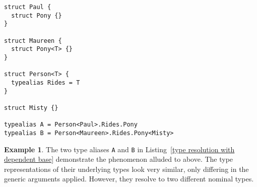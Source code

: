 \documentclass[a4paper,headsepline,bibliography=totoc,toc=flat,fleqn,twoside=semi]{scrbook}
\theoremstyle{definition}
\theoremstyle{definition}
\newtheorem{example}{Example}[chapter]
\theoremstyle{definition}
\begin{document}
\begin{listing}\label{type resolution with dependent base}
\begin{Verbatim}
struct Paul {
  struct Pony {}
}

struct Maureen {
  struct Pony<T> {}
}

struct Person<T> {
  typealias Rides = T
}

struct Misty {}

typealias A = Person<Paul>.Rides.Pony
typealias B = Person<Maureen>.Rides.Pony<Misty>
\end{Verbatim}
\end{listing}
\begin{example}
The two type aliases \texttt{A} and \texttt{B} in Listing~\ref{type resolution with dependent base} demonstrate the phenomenon alluded to above. The type representations of their underlying types look very similar, only differing in the generic arguments applied. However, they resolve to two different nominal types.


\end{example}
\end{document}
